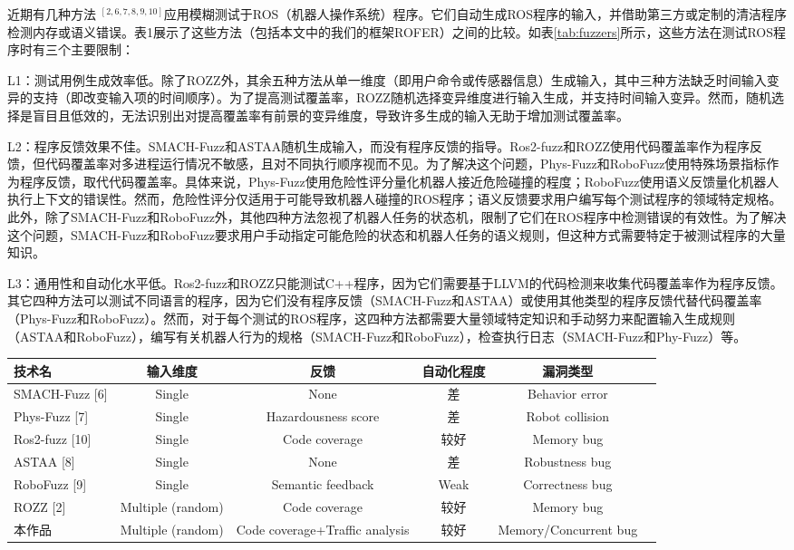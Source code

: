近期有几种方法 $^{[2, 6, 7, 8, 9, 10]}$应用模糊测试于ROS（机器人操作系统）程序。它们自动生成ROS程序的输入，并借助第三方或定制的清洁程序检测内存或语义错误。表1展示了这些方法（包括本文中的我们的框架ROFER）之间的比较。如表\ref{tab:fuzzers}所示，这些方法在测试ROS程序时有三个主要限制：

L1：测试用例生成效率低。除了ROZZ外，其余五种方法从单一维度（即用户命令或传感器信息）生成输入，其中三种方法缺乏时间输入变异的支持（即改变输入项的时间顺序）。为了提高测试覆盖率，ROZZ随机选择变异维度进行输入生成，并支持时间输入变异。然而，随机选择是盲目且低效的，无法识别出对提高覆盖率有前景的变异维度，导致许多生成的输入无助于增加测试覆盖率。

L2：程序反馈效果不佳。SMACH-Fuzz和ASTAA随机生成输入，而没有程序反馈的指导。Ros2-fuzz和ROZZ使用代码覆盖率作为程序反馈，但代码覆盖率对多进程运行情况不敏感，且对不同执行顺序视而不见。为了解决这个问题，Phys-Fuzz和RoboFuzz使用特殊场景指标作为程序反馈，取代代码覆盖率。具体来说，Phys-Fuzz使用危险性评分量化机器人接近危险碰撞的程度；RoboFuzz使用语义反馈量化机器人执行上下文的错误性。然而，危险性评分仅适用于可能导致机器人碰撞的ROS程序；语义反馈要求用户编写每个测试程序的领域特定规格。此外，除了SMACH-Fuzz和RoboFuzz外，其他四种方法忽视了机器人任务的状态机，限制了它们在ROS程序中检测错误的有效性。为了解决这个问题，SMACH-Fuzz和RoboFuzz要求用户手动指定可能危险的状态和机器人任务的语义规则，但这种方式需要特定于被测试程序的大量知识。

L3：通用性和自动化水平低。Ros2-fuzz和ROZZ只能测试C++程序，因为它们需要基于LLVM的代码检测来收集代码覆盖率作为程序反馈。其它四种方法可以测试不同语言的程序，因为它们没有程序反馈（SMACH-Fuzz和ASTAA）或使用其他类型的程序反馈代替代码覆盖率（Phys-Fuzz和RoboFuzz）。然而，对于每个测试的ROS程序，这四种方法都需要大量领域特定知识和手动努力来配置输入生成规则（ASTAA和RoboFuzz），编写有关机器人行为的规格（SMACH-Fuzz和RoboFuzz），检查执行日志（SMACH-Fuzz和Phy-Fuzz）等。

\begin{table*}[t]
\small
\centering
\caption{最新针对ROS系统的Fuzz技术对比}
\begin{tabular}{lccccc}
\hline
\textbf{技术名} & \textbf{输入维度}  & \textbf{反馈}& \textbf{自动化程度} & \textbf{漏洞类型} \\ \hline\hline
SMACH-Fuzz [6] & Single & None& 差 & Behavior error \\ \hline
Phys-Fuzz [7] & Single  & Hazardousness score  & 差& Robot collision \\ \hline
Ros2-fuzz [10] & Single  & Code coverage   & 较好 & Memory bug \\ \hline
ASTAA [8] & Single & None  & 差 & Robustness bug \\ \hline
RoboFuzz [9] & Single  & Semantic feedback & Weak & Correctness bug \\ \hline
ROZZ [2] & Multiple (random) & Code coverage & 较好 & Memory bug \\ \hline
本作品 & Multiple (random)  & Code coverage+Traffic analysis & 较好& Memory/Concurrent bug \\ \hline
\end{tabular}
\label{tab:fuzzers}
\end{table*}
